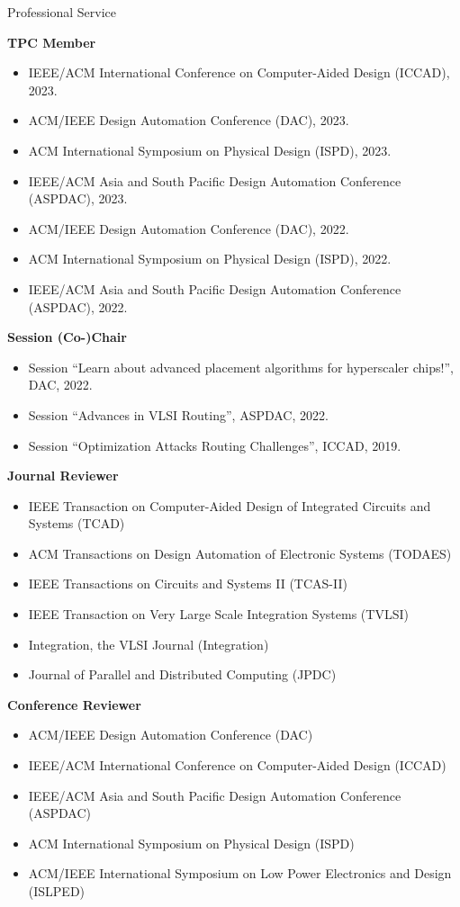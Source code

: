 
\begin{rSection}{Professional Service}

\textbf{TPC Member}
\begin{itemize}
    \item IEEE/ACM International Conference on Computer-Aided Design (ICCAD), 2023.
    \item ACM/IEEE Design Automation Conference (DAC), 2023.
    \item ACM International Symposium on Physical Design (ISPD), 2023.
    \item IEEE/ACM Asia and South Pacific Design Automation Conference (ASPDAC), 2023.
    \item ACM/IEEE Design Automation Conference (DAC), 2022.
    \item ACM International Symposium on Physical Design (ISPD), 2022.
    \item IEEE/ACM Asia and South Pacific Design Automation Conference (ASPDAC), 2022.
\end{itemize}

\textbf{Session (Co-)Chair}
\begin{itemize}
    \item Session ``Learn about advanced placement algorithms for hyperscaler chips!'', DAC, 2022.
    \item Session ``Advances in VLSI Routing'', ASPDAC, 2022.
    \item Session ``Optimization Attacks Routing Challenges'', ICCAD, 2019.
\end{itemize}

\textbf{Journal Reviewer}
\begin{itemize}
    \item IEEE Transaction on Computer-Aided Design of Integrated Circuits and Systems (TCAD)
    \item ACM Transactions on Design Automation of Electronic Systems (TODAES)
    \item IEEE Transactions on Circuits and Systems II (TCAS-II)
    \item IEEE Transaction on Very Large Scale Integration Systems (TVLSI)
    \item Integration, the VLSI Journal (Integration)
    \item Journal of Parallel and Distributed Computing (JPDC)
\end{itemize}

\textbf{Conference Reviewer}
\begin{itemize}
    \item ACM/IEEE Design Automation Conference (DAC)
    \item IEEE/ACM International Conference on Computer-Aided Design (ICCAD)
    \item IEEE/ACM Asia and South Pacific Design Automation Conference (ASPDAC)
    \item ACM International Symposium on Physical Design (ISPD)
    \item ACM/IEEE International Symposium on Low Power Electronics and Design (ISLPED)
\end{itemize}
\end{rSection}


